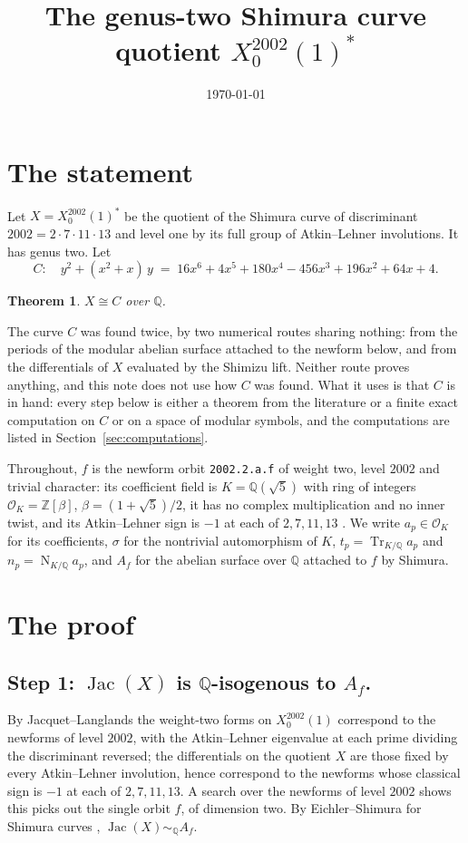 \documentclass[11pt,reqno]{amsart}
\theoremstyle{plain}
\newtheorem{theorem}{Theorem}
\theoremstyle{definition}
\DeclareMathOperator{\Jac}{Jac}
\DeclareMathOperator{\Tr}{Tr}
\DeclareMathOperator{\Norm}{N}
\newcommand{\Q}{\mathbb{Q}}
\newcommand{\Z}{\mathbb{Z}}
\newcommand{\OK}{\mathcal{O}_K}
\begin{document}
\title{The genus-two Shimura curve quotient $X_0^{2002}(1)^*$}
\author{}
\date{\today}
\maketitle

\section{The statement}

Let $X = X_0^{2002}(1)^*$ be the quotient of the Shimura curve of discriminant $2002 = 2\cdot 7\cdot
11\cdot 13$ and level one by its full group of Atkin--Lehner involutions. It has genus two. Let
\[
  C:\quad y^2 + (x^2+x)\,y \;=\; 16x^6 + 4x^5 + 180x^4 - 456x^3 + 196x^2 + 64x + 4 .
\]

\begin{theorem}\label{thm:main}
$X \cong C$ over $\Q$.
\end{theorem}

The curve $C$ was found twice, by two numerical routes sharing nothing: from the periods of the
modular abelian surface attached to the newform below, and from the differentials of $X$ evaluated
by the Shimizu lift. Neither route proves anything, and this note does not use how $C$ was found.
What it uses is that $C$ is in hand: every step below is either a theorem from the literature or a
finite exact computation on $C$ or on a space of modular symbols, and the computations are listed
in Section~\ref{sec:computations}.

Throughout, $f$ is the newform orbit \texttt{2002.2.a.f} of weight two, level $2002$ and trivial
character: its coefficient field is $K=\Q(\sqrt5)$ with ring of integers $\OK=\Z[\beta]$,
$\beta=(1+\sqrt5)/2$, it has no complex multiplication and no inner twist, and its Atkin--Lehner
sign is $-1$ at each of $2,7,11,13$ \cite{lmfdb}. We write $a_p\in\OK$ for its coefficients,
$\sigma$ for the nontrivial automorphism of $K$, $t_p=\Tr_{K/\Q}a_p$ and $n_p=\Norm_{K/\Q}a_p$,
and $A_f$ for the abelian surface over $\Q$ attached to $f$ by Shimura.

\section{The proof}

\subsection*{Step 1: $\Jac(X)$ is $\Q$-isogenous to $A_f$.}
By Jacquet--Langlands the weight-two forms on $X_0^{2002}(1)$ correspond to the newforms of level
$2002$, with the Atkin--Lehner eigenvalue at each prime dividing the discriminant reversed; the
differentials on the quotient $X$ are those fixed by every Atkin--Lehner involution, hence
correspond to the newforms whose classical sign is $-1$ at each of $2,7,11,13$. A search over the
newforms of level $2002$ shows this picks out the single orbit $f$, of dimension two. By
Eichler--Shimura for Shimura curves \cite{ribet80}, $\Jac(X)\sim_\Q A_f$.
\end{document}
